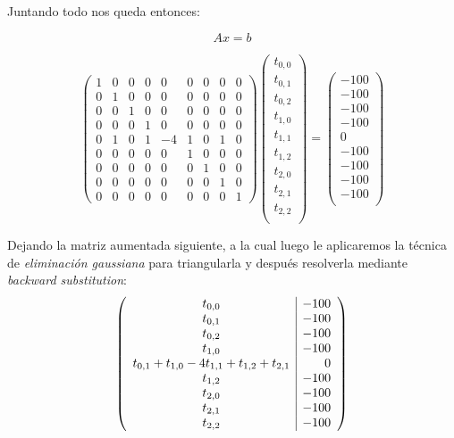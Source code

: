 Juntando todo nos queda entonces:

\[ Ax = b \]

$$
\left( \begin{array}{ccccccccc}
1 & 0 & 0 & 0 & 0 & 0 & 0 & 0 & 0 \\
0 & 1 & 0 & 0 & 0 & 0 & 0 & 0 & 0 \\
0 & 0 & 1 & 0 & 0 & 0 & 0 & 0 & 0 \\ 
0 & 0 & 0 & 1 & 0 & 0 & 0 & 0 & 0 \\
0 & 1 & 0 & 1 & -4 & 1 & 0 & 1 & 0 \\
0 & 0 & 0 & 0 & 0 & 1 & 0 & 0 & 0 \\ 
0 & 0 & 0 & 0 & 0 & 0 & 1 & 0 & 0 \\
0 & 0 & 0 & 0 & 0 & 0 & 0 & 1 & 0 \\
0 & 0 & 0 & 0 & 0 & 0 & 0 & 0 & 1
\end{array} \right)	\left( \begin{array}{c}
t_{0,0} \\
t_{0,1} \\
t_{0,2} \\
t_{1,0} \\
t_{1,1} \\
t_{1,2} \\
t_{2,0} \\
t_{2,1} \\
t_{2,2} \\
\end{array} \right) = \left( \begin{array}{c}
-100 \\
-100 \\
-100 \\
-100 \\
0 \\
-100 \\
-100 \\
-100 \\
-100 \\
\end{array} \right)
$$
\par
Dejando la matriz aumentada siguiente, a la cual luego le aplicaremos la técnica de \textit{eliminación gaussiana} para triangularla y después resolverla mediante \textit{backward substitution}:
\vspace{\baselineskip}
$$
\left( \begin{array}{c | r}
t_{0,0} & -100\\
t_{0,1} & -100\\
t_{0,2} & -100 \\
t_{1,0} & -100\\
t_{0,1} + t_{1,0} - 4t_{1,1} + t_{1,2} + t_{2,1} & 0\\
t_{1,2} & -100\\
t_{2,0} & -100\\
t_{2,1} & -100\\
t_{2,2} & -100\\
\end{array} \right)
$$

